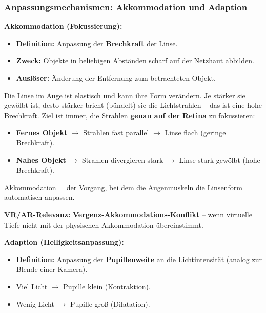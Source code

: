 \documentclass[12pt, a4paper]{article}
\begin{document}
\subsubsection{Anpassungsmechanismen: Akkommodation und Adaption}

\textbf{Akkommodation (Fokussierung):}
\begin{itemize}
  \item \textbf{Definition:} Anpassung der \textbf{Brechkraft} der Linse.
  \item \textbf{Zweck:} Objekte in beliebigen Abständen scharf auf der Netzhaut
        abbilden.
  \item \textbf{Auslöser:} Änderung der Entfernung zum betrachteten Objekt.
\end{itemize}

\begin{notebox}[title={Was ist Brechkraft der Linse?}]
  Die Linse im Auge ist elastisch und kann ihre Form verändern. Je stärker sie
  gewölbt ist, desto stärker bricht (bündelt) sie die Lichtstrahlen -- das ist
  eine hohe Brechkraft. Ziel ist immer, die Strahlen \textbf{genau auf der Retina}
  zu fokussieren:
  \begin{itemize}[noitemsep]
    \item \textbf{Fernes Objekt} $\rightarrow$ Strahlen fast parallel $\rightarrow$
          Linse flach (geringe Brechkraft).
    \item \textbf{Nahes Objekt} $\rightarrow$ Strahlen divergieren stark $\rightarrow$
          Linse stark gewölbt (hohe Brechkraft).
  \end{itemize}
  Akkommodation = der Vorgang, bei dem die Augenmuskeln die Linsenform automatisch
  anpassen.
\end{notebox}

\begin{notebox}
  \textbf{VR/AR-Relevanz:} \textbf{Vergenz-Akkommodations-Konflikt} -- wenn virtuelle
  Tiefe nicht mit der physischen Akkommodation übereinstimmt.
\end{notebox}

\textbf{Adaption (Helligkeitsanpassung):}
\begin{itemize}
  \item \textbf{Definition:} Anpassung der \textbf{Pupillenweite} an die
        Lichtintensität (analog zur Blende einer Kamera).
  \item Viel Licht $\rightarrow$ Pupille klein (Kontraktion).
  \item Wenig Licht $\rightarrow$ Pupille groß (Dilatation).
\end{itemize}
\end{document}

